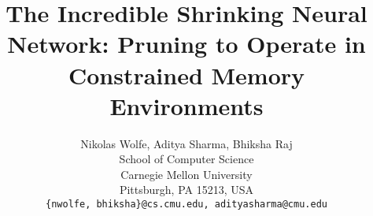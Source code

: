 \documentclass[hidelinks]{article} %
\title{The Incredible Shrinking Neural Network: Pruning to Operate in Constrained Memory Environments}
\author{Nikolas Wolfe, Aditya Sharma, Bhiksha Raj\\
School of Computer Science\\
Carnegie Mellon University\\
Pittsburgh, PA 15213, USA \\
\texttt{\{nwolfe, bhiksha\}@cs.cmu.edu, {adityasharma}@cmu.edu}\\
}
\begin{document}
\maketitle





%




%

%
%
\pagebreak


%
%





\end{document}
